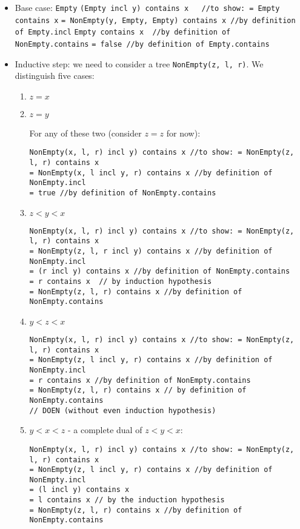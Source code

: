 \documentclass{scrartcl}
\begin{document}
\begin{itemize}
\item Base case: \lstinline|Empty|
\lstinline|(Empty incl y) contains x   //to show: = Empty contains x|
\lstinline|= NonEmpty(y, Empty, Empty) contains x //by definition of Empty.incl|
\lstinline|Empty contains x  //by definition of NonEmpty.contains|
\lstinline|= false //by definition of Empty.contains|


\item Inductive step: we need to consider a tree \lstinline|NonEmpty(z, l, r)|.
  We distinguish five cases:
  \begin{enumerate}
  \item $z = x$
  \item $z = y$

    For any of these two (consider $z = z$ for now):
\begin{lstlisting}
NonEmpty(x, l, r) incl y) contains x //to show: = NonEmpty(z, l, r) contains x
= NonEmpty(x, l incl y, r) contains x //by definition of NonEmpty.incl
= true //by definition of NonEmpty.contains
\end{lstlisting}

  \item $z < y < x$
\begin{lstlisting}
NonEmpty(x, l, r) incl y) contains x //to show: = NonEmpty(z, l, r) contains x
= NonEmpty(z, l, r incl y) contains x //by definition of NonEmpty.incl
= (r incl y) contains x //by definition of NonEmpty.contains
= r contains x  // by induction hypothesis
= NonEmpty(z, l, r) contains x //by definition of NonEmpty.contains
\end{lstlisting}
  \item $y < z < x$
\begin{lstlisting}
NonEmpty(x, l, r) incl y) contains x //to show: = NonEmpty(z, l, r) contains x
= NonEmpty(z, l incl y, r) contains x //by definition of NonEmpty.incl
= r contains x //by definition of NonEmpty.contains
= NonEmpty(z, l, r) contains x // by definition of NonEmpty.contains
// DOEN (without even induction hypothesis)
\end{lstlisting}
  \item $y < x < z$ - a complete dual of $z < y < x$:
\begin{lstlisting}
NonEmpty(x, l, r) incl y) contains x //to show: = NonEmpty(z, l, r) contains x
= NonEmpty(z, l incl y, r) contains x //by definition of NonEmpty.incl
= (l incl y) contains x
= l contains x // by the induction hypothesis
= NonEmpty(z, l, r) contains x //by definition of NonEmpty.contains
\end{lstlisting}
  \end{enumerate}


\end{itemize}
\end{document}
